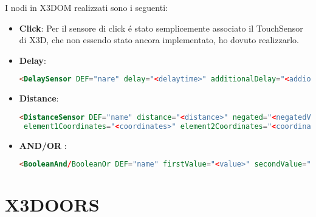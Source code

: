 \documentclass[11pt]{article}
\begin{document}
    I nodi in X3DOM realizzati sono i seguenti: 
    
    \begin{itemize}
        \item \textbf{Click}: Per il sensore di click é stato semplicemente associato il TouchSensor di X3D, che non essendo stato ancora implementato, ho dovuto realizzarlo. \\ 
        \item \textbf{Delay}: \\
            \begin{lstlisting}[language=html]
<DelaySensor DEF="nare" delay="<delaytime>" additionalDelay="<addiotionalDelay"/> 
            \end{lstlisting}
        \item \textbf{Distance}: \\
            \begin{lstlisting}[language=html]
<DistanceSensor DEF="name" distance="<distance>" negated="<negatedValue>"
 element1Coordinates="<coordinates>" element2Coordinates="<coordinates>" />
            \end{lstlisting}
        \item \textbf{AND/OR} : \\ 
            \begin{lstlisting}[language=html]
<BooleanAnd/BooleanOr DEF="name" firstValue="<value>" secondValue="<value>" /> 
            \end{lstlisting}
    \end{itemize}

\section{X3DOORS}
\end{document}
